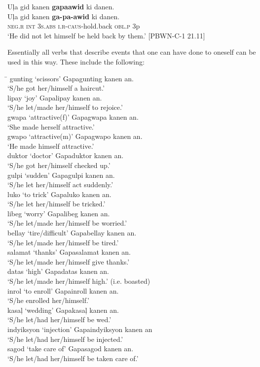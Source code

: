\newpage
\ea
Uļa  gid  kanen  \textbf{gapaawid}  ki  danen. \\\smallskip
\gll Uļa  gid  kanen  \textbf{ga-pa-awid}  ki  danen. \\
\textsc{neg.r}  \textsc{int}  \textsc{3}\textsc{s.abs}  \textsc{i.r-caus-}hold.back  \textsc{obl.p}  3p \\
\glt ‘He did not let himself be held back by them.’ [PBWN-C-1 21.11]
\z

Essentially all verbs that describe events that one can have done to oneself can be used in this way. These include the following:

\ea
\label{ex:haircut}
\begin{tabbing}
\hspace{3.5cm} \= \kill
gunting ‘scissors’ \> Gapagunting kanen an. \\
\>‘S/he got her/himself a haircut.’ \\
lipay ‘joy’  \>  Gapalipay kanen an. \\
\>‘S/he let/made her/himself to rejoice.’ \\
gwapa ‘attractive(f)’ \> Gapagwapa kanen an. \\ 
\>‘She made herself attractive.’ \\
gwapo ‘attractive(m)’ \> Gapagwapo kanen an. \\
\>‘He made himself attractive.’ \\
duktor ‘doctor’ \> Gapaduktor kanen an. \\
\>‘S/he got her/himself checked up.’ \\
gulpi ‘sudden’ \> Gapagulpi kanen an. \\
\>‘S/he let her/himself act suddenly.’ \\
luko ‘to trick’ \> Gapaluko kanen an. \\
\>‘S/he let her/himself be tricked.’ \\
libeg ‘worry’  \>  Gapalibeg kanen an. \\
\>‘S/he let/made her/himself be worried.’ \\
bellay ‘tire/difficult’	\> Gapabellay kanen an. \\
\>‘S/he let/made her/himself be tired.’ \\
salamat ‘thanks’ \> Gapasalamat kanen an. \\ 
\>‘S/he let/made her/himself give thanks.’ \\
datas ‘high’ \>   Gapadatas kanen an. \\
\>‘S/he let/made her/himself high.’ (i.e. boasted) \\
inrol ‘to enroll’ \> Gapainroll kanen an. \\ 
\>‘S/he enrolled her/himself.’ \\
kasaļ ‘wedding’ \> Gapakasaļ kanen an. \\
\>‘S/he let/had her/himself be wed.' \\
indyiksyon ‘injection’ \> Gapaindyiksyon kanen an \\ 
\>‘S/he let/had her/himself be injected.’ \\
sagod ‘take care of’ \> Gapasagod kanen an. \\
\>‘S/he let/had her/himself be taken care of.’
\end{tabbing}
\z
